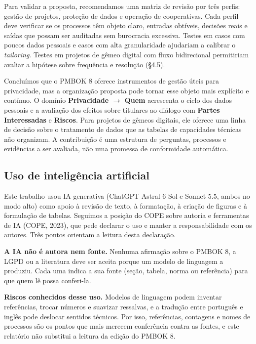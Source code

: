 \documentclass[11pt,a4paper]{article}
\newif\ifavisofinal  \avisofinaltrue    %
\begin{document}
Para validar a proposta, recomendamos uma matriz de revisão por três perfis: gestão de projetos, proteção de dados e operação de cooperativas. Cada perfil deve verificar se os processos têm objeto claro, entradas obtíveis, decisões reais e saídas que possam ser auditadas sem burocracia excessiva. Testes em casos com poucos dados pessoais e casos com alta granularidade ajudariam a calibrar o \textit{tailoring}. Testes em projetos de gêmeo digital com fluxo bidirecional permitiriam avaliar a hipótese sobre frequência e resolução (§4.5).

Concluímos que o PMBOK 8 oferece instrumentos de gestão úteis para privacidade, mas a organização proposta pode tornar esse objeto mais explícito e contínuo. O domínio \textbf{Privacidade \ensuremath{\rightarrow} Quem} acrescenta o ciclo dos dados pessoais e a avaliação dos efeitos sobre titulares ao diálogo com \textbf{Partes Interessadas} e \textbf{Riscos}. Para projetos de gêmeos digitais, ele oferece uma linha de decisão sobre o tratamento de dados que as tabelas de capacidades técnicas não organizam. A contribuição é uma estrutura de perguntas, processos e evidências a ser avaliada, não uma promessa de conformidade automática.

\ifavisofinal
\subsection{Uso de inteligência artificial}

Este trabalho usou IA generativa (ChatGPT Astral 6 Sol e Sonnet 5.5, ambos no modo alto) como apoio à revisão de texto, à formatação, à criação de figuras e à formulação de tabelas. Seguimos a posição do COPE sobre autoria e ferramentas de IA (COPE, 2023), que pede declarar o uso e manter a responsabilidade com os autores. Três pontos orientam a leitura desta declaração.

\textbf{A IA não é autora nem fonte.} Nenhuma afirmação sobre o PMBOK 8, a LGPD ou a literatura deve ser aceita porque um modelo de linguagem a produziu. Cada uma indica a sua fonte (seção, tabela, norma ou referência) para que quem lê possa conferi-la.

\textbf{Riscos conhecidos desse uso.} Modelos de linguagem podem inventar referências, trocar números e suavizar ressalvas, e a tradução entre português e inglês pode deslocar sentidos técnicos. Por isso, referências, contagens e nomes de processos são os pontos que mais merecem conferência contra as fontes, e este relatório não substitui a leitura da edição do PMBOK 8.
\end{document}
